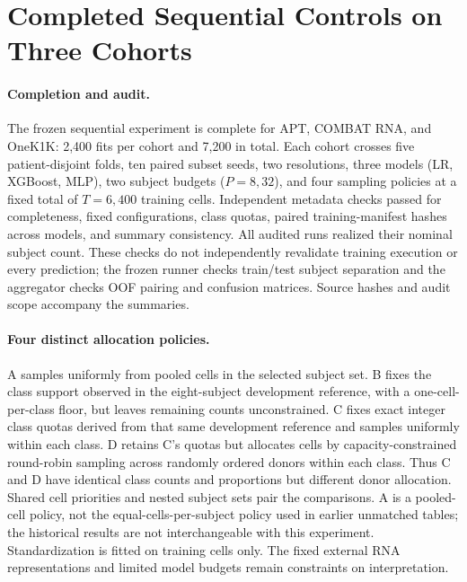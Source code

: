 \section{Completed Sequential Controls on Three Cohorts}
\label{sec:sequential_completed}

\paragraph{Completion and audit.}
The frozen sequential experiment is complete for APT, COMBAT RNA, and
OneK1K: 2,400 fits per cohort and 7,200 in total. Each cohort crosses five
patient-disjoint folds, ten paired subset seeds, two resolutions, three
models (LR, XGBoost, MLP), two subject budgets ($P=8,32$), and four sampling
policies at a fixed total of $T=6{,}400$ training cells. Independent metadata
checks passed for completeness, fixed configurations, class quotas, paired
training-manifest hashes across models, and summary consistency. All audited
runs realized their nominal subject count. These checks do not independently
revalidate training execution or every prediction; the frozen runner checks
train/test subject separation and the aggregator checks OOF pairing and
confusion matrices. Source hashes and audit scope accompany the summaries.

\paragraph{Four distinct allocation policies.}
A samples uniformly from pooled cells in the selected subject set. B fixes
the class support observed in the eight-subject development reference, with
a one-cell-per-class floor, but leaves remaining counts unconstrained. C
fixes exact integer class quotas derived from that same development
reference and samples uniformly within each class. D retains C's quotas
but allocates cells by capacity-constrained round-robin sampling across
randomly ordered donors within each class. Thus C and D have identical
class counts and proportions but different donor allocation. Shared cell
priorities and nested subject sets pair the comparisons. A is a pooled-cell
policy, not the equal-cells-per-subject policy used in earlier unmatched
tables; the historical results are not interchangeable with this experiment.
Standardization is fitted on training cells only. The fixed external RNA
representations and limited model budgets remain constraints on interpretation.

